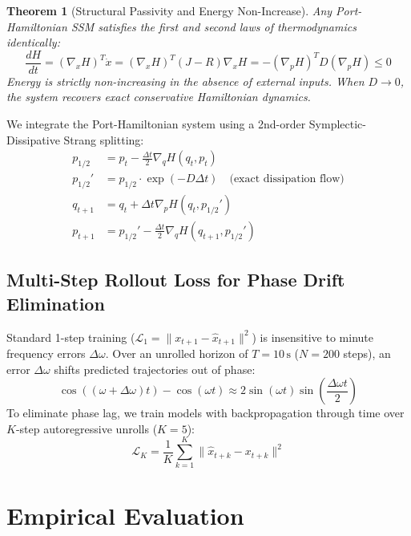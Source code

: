 \documentclass[11pt,a4paper]{article}
\newtheorem{theorem}{Theorem}
\begin{document}
\begin{theorem}[Structural Passivity and Energy Non-Increase]
Any Port-Hamiltonian SSM satisfies the first and second laws of thermodynamics identically:
\begin{equation}
\frac{dH}{dt} = (\nabla_x H)^T \dot{x} = (\nabla_x H)^T (J - R) \nabla_x H = -(\nabla_p H)^T D (\nabla_p H) \le 0
\end{equation}
Energy is strictly non-increasing in the absence of external inputs. When $D \to 0$, the system recovers exact conservative Hamiltonian dynamics.
\end{theorem}

We integrate the Port-Hamiltonian system using a 2nd-order Symplectic-Dissipative Strang splitting:
\begin{align}
p_{1/2} &= p_t - \frac{\Delta t}{2} \nabla_q H(q_t, p_t) \\
p_{1/2}' &= p_{1/2} \cdot \exp(-D \Delta t) \quad \text{(exact dissipation flow)} \\
q_{t+1} &= q_t + \Delta t \nabla_p H(q_t, p_{1/2}') \\
p_{t+1} &= p_{1/2}' - \frac{\Delta t}{2} \nabla_q H(q_{t+1}, p_{1/2}')
\end{align}

\subsection{Multi-Step Rollout Loss for Phase Drift Elimination}
Standard 1-step training ($\mathcal{L}_1 = \|x_{t+1} - \hat{x}_{t+1}\|^2$) is insensitive to minute frequency errors $\Delta \omega$. Over an unrolled horizon of $T = 10\,\text{s}$ ($N = 200$ steps), an error $\Delta \omega$ shifts predicted trajectories out of phase:
\begin{equation}
\cos((\omega + \Delta \omega)t) - \cos(\omega t) \approx 2 \sin(\omega t) \sin\left(\frac{\Delta \omega t}{2}\right)
\end{equation}
To eliminate phase lag, we train models with backpropagation through time over $K$-step autoregressive unrolls ($K = 5$):
\begin{equation}
\mathcal{L}_K = \frac{1}{K} \sum_{k=1}^K \|\hat{x}_{t+k} - x_{t+k}\|^2
\end{equation}

\section{Empirical Evaluation}
\end{document}
